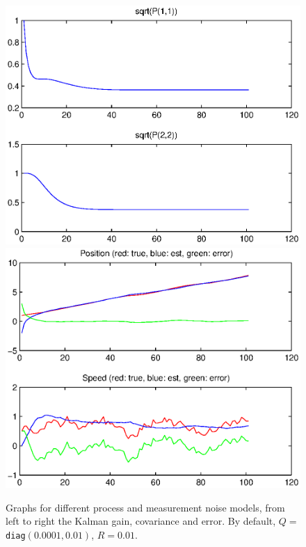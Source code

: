 \documentclass[a4paper,12pt]{article}
\begin{document}
\begin{enumerate}
\begin{figure}
{{          \includegraphics[width=.43\textwidth]{figures/kf/highr_covar}
          \includegraphics[width=.43\textwidth]{figures/kf/highr_error}
        }
        \label{fig:hir}
      }
      \caption{Graphs for different process and measurement noise models, from
        left to right the Kalman gain, covariance and error. By default,
        $Q=$\texttt{diag}$(0.0001,0.01)$, $R=0.01$.}
  \end{figure}
  \begin{figure}
    \renewcommand{\figurename}{Figure (cont.)}
    \ContinuedFloat
\end{figure}
\end{enumerate}
\end{document}
